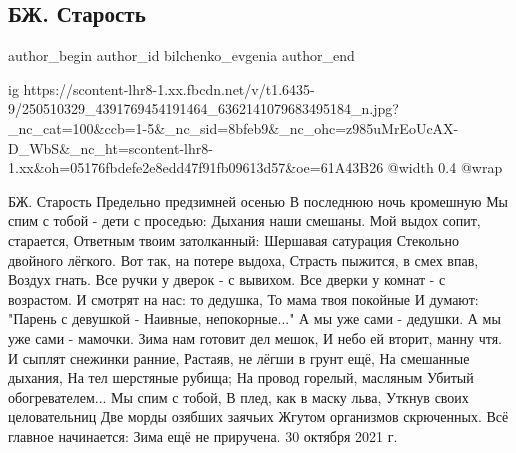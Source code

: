  
 
 
 
 
 
\subsection{БЖ. Старость}
\label{sec:30_10_2021.fb.bilchenko_evgenia.3.starost}
 
\ifcmt
 author_begin
   author_id bilchenko_evgenia
 author_end
\fi

\ifcmt
  ig https://scontent-lhr8-1.xx.fbcdn.net/v/t1.6435-9/250510329_4391769454191464_6362141079683495184_n.jpg?_nc_cat=100&ccb=1-5&_nc_sid=8bfeb9&_nc_ohc=z985uMrEoUcAX-D_WbS&_nc_ht=scontent-lhr8-1.xx&oh=05176fbdefe2e8edd47f91fb09613d57&oe=61A43B26
  @width 0.4
  @wrap 
\fi

БЖ. Старость
Предельно предзимней осенью
В последнюю ночь кромешную
Мы спим с тобой - дети с проседью:
Дыхания наши смешаны.
Мой выдох сопит, старается,
Ответным твоим затолканный:
Шершавая сатурация
Стекольно двойного лёгкого.
Вот так, на потере выдоха,
Страсть пыжится,  в смех впав, 
Воздух гнать.
Все ручки у дверок - с вывихом.
Все дверки у комнат - с возрастом.
И смотрят на нас: то дедушка,
То мама твоя покойные
И думают: "Парень с девушкой -
Наивные, непокорные..."
А мы уже сами - дедушки.
А мы уже сами - мамочки.
Зима нам готовит дел мешок,
И небо ей вторит, манну чтя.
И сыплят снежинки ранние,
Растаяв, не лёгши в грунт ещё,
На смешанные дыхания,
На тел шерстяные рубища;
На провод горелый, масляным
Убитый обогревателем...
Мы спим с тобой, 
В плед, как в маску льва,
Уткнув своих целовательниц
Две морды озябших заячьих
Жгутом организмов скрюченных.
Всё главное начинается:
Зима ещё не приручена.
30 октября 2021 г.
